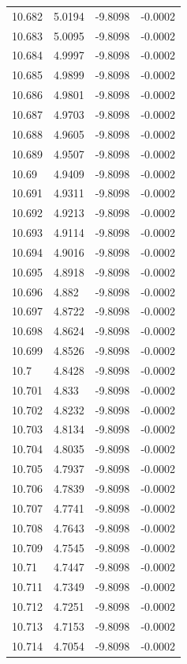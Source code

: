 \begin{tabular}{llll}
10.682 & 5.0194 & -9.8098 & -0.0002 \\
10.683 & 5.0095 & -9.8098 & -0.0002 \\
10.684 & 4.9997 & -9.8098 & -0.0002 \\
10.685 & 4.9899 & -9.8098 & -0.0002 \\
10.686 & 4.9801 & -9.8098 & -0.0002 \\
10.687 & 4.9703 & -9.8098 & -0.0002 \\
10.688 & 4.9605 & -9.8098 & -0.0002 \\
10.689 & 4.9507 & -9.8098 & -0.0002 \\
10.69 & 4.9409 & -9.8098 & -0.0002 \\
10.691 & 4.9311 & -9.8098 & -0.0002 \\
10.692 & 4.9213 & -9.8098 & -0.0002 \\
10.693 & 4.9114 & -9.8098 & -0.0002 \\
10.694 & 4.9016 & -9.8098 & -0.0002 \\
10.695 & 4.8918 & -9.8098 & -0.0002 \\
10.696 & 4.882 & -9.8098 & -0.0002 \\
10.697 & 4.8722 & -9.8098 & -0.0002 \\
10.698 & 4.8624 & -9.8098 & -0.0002 \\
10.699 & 4.8526 & -9.8098 & -0.0002 \\
10.7 & 4.8428 & -9.8098 & -0.0002 \\
10.701 & 4.833 & -9.8098 & -0.0002 \\
10.702 & 4.8232 & -9.8098 & -0.0002 \\
10.703 & 4.8134 & -9.8098 & -0.0002 \\
10.704 & 4.8035 & -9.8098 & -0.0002 \\
10.705 & 4.7937 & -9.8098 & -0.0002 \\
10.706 & 4.7839 & -9.8098 & -0.0002 \\
10.707 & 4.7741 & -9.8098 & -0.0002 \\
10.708 & 4.7643 & -9.8098 & -0.0002 \\
10.709 & 4.7545 & -9.8098 & -0.0002 \\
10.71 & 4.7447 & -9.8098 & -0.0002 \\
10.711 & 4.7349 & -9.8098 & -0.0002 \\
10.712 & 4.7251 & -9.8098 & -0.0002 \\
10.713 & 4.7153 & -9.8098 & -0.0002 \\
10.714 & 4.7054 & -9.8098 & -0.0002 \\

\end{tabular}
